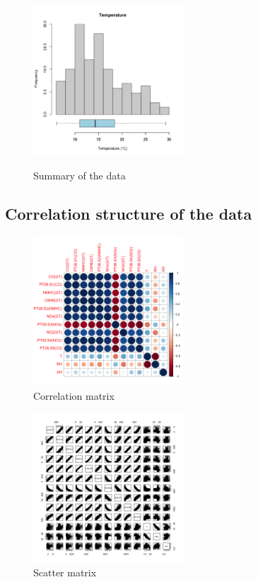 \begin{figure}[H]
  \centering
  \includegraphics[width=0.5\textwidth]{figs/summary_3.png}
  \label{fig:summary}
  \caption{Summary of the data}
\end{figure}


\subsection{Correlation structure of the data}
\begin{figure}[H]
  \centering
  \includegraphics[width=0.5\textwidth]{figs/corr.png}
  \caption{Correlation matrix}
  \label{fig:corr}
\end{figure}

\begin{figure}[H]
  \centering
  \includegraphics[width=0.5\textwidth]{figs/scatter_matrix.png}
  \caption{Scatter matrix}
  \label{fig:scatter_matrix}
\end{figure}

